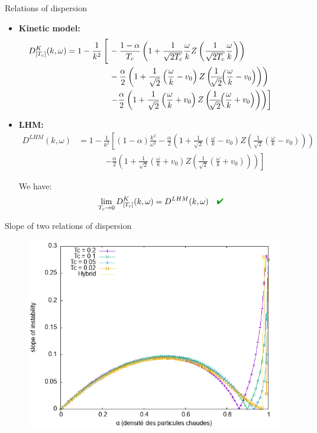 \documentclass{beamer}
\newcommand{\cmark}{\color{dgreen}\ding{52}}
\newcommand{\mbold}[1]{{\textbf{\color{PLB}#1}}}
\begin{document}
\begin{frame}{Relations of dispersion}
  \begin{itemize}
    \item \mbold{Kinetic model:}$$\begin{aligned}
    \!\!\!\!\!\!\!\!\!\!\!\!\!\!\!D^K_{[T_c]}(k,\omega) = 1 - \frac{1}{k^2}\left[\vphantom{\frac{}{\sqrt{}}}\right. & -\frac{1-\alpha}{T_c}\left( 1 + \frac{1}{\sqrt{2T_c}}\frac{\omega}{k}Z\left( \frac{1}{\sqrt{2T_c}}\frac{\omega}{k}\right) \right) \\
                                          & -\frac{\alpha}{2}\left( 1 + \frac{1}{\sqrt{2}}\left(\frac{\omega}{k}-v_0\right)Z\left(\!\!\frac{1}{\sqrt{2}}\!\!\left(\frac{\omega}{k}-v_0\right)\right) \right) \\
                                          & \left. -\frac{\alpha}{2}\left( 1 + \frac{1}{\sqrt{2}}\left(\frac{\omega}{k}+v_0\right)Z\left(\!\!\frac{1}{\sqrt{2}}\!\!\left(\frac{\omega}{k}+v_0\right)\right) \right)  \right]
  \end{aligned}$$
  \item \mbold{LHM:}$$
  \begin{aligned}
      \!\!\!\!\!\!\!\!\!\!\!\!\!\!\!D^{LHM}(k,\omega)
    &=1-\frac{1}{k^2}\left[\left(1-\alpha\right)\frac{k^2}{\omega^2}-\frac{\alpha}{2}\left(1+\frac{1}{\sqrt{2}}\left(\frac{\omega}{k}-v_0\right)Z\left(\!\!\frac{1}{\sqrt{2}}\!\!\left(\frac{\omega}{k}-v_0\right)\right)\right)\right.\nonumber\\
    &~~~~~~~~~~~~~~~\left.-\frac{\alpha}{2}\left(1+\frac{1}{\sqrt{2}}\left(\frac{\omega}{k}+v_0\right)Z\left(\!\!\frac{1}{\sqrt{2}}\!\!\left(\frac{\omega}{k}+v_0\right)\right)\right)\right]
  \end{aligned}
  $$

  We have: $$\lim_{T_c\to 0}D^K_{[T_c]}(k,\omega) = D^{LHM}(k,\omega)\quad\text{\cmark}$$
  \end{itemize}
\end{frame}
\begin{frame}{Slope of two relations of dispersion}
  \begin{figure}\centering
    \includegraphics[height=0.8\textheight]{img/limit_slope_alpha.png}
  \end{figure}
\end{frame}
\end{document}
